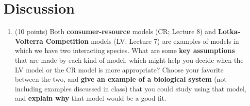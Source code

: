 \documentclass[11pt,onecolumn,superscriptaddress,notitlepage]{article}
\begin{document}
  \clearpage
  \section{Discussion}
 \begin{enumerate}[resume]
  \item (10 points) Both {\bf consumer-resource} models (CR; Lecture 8) and {\bf Lotka-Volterra Competition} models (LV; Lecture 7) are examples of models in which we have two interacting species. What are some {\bf key assumptions} that are made by each kind of model, which might help you decide when the LV model or the CR model is more appropriate?  Choose your favorite between the two, and {\bf give an example of a biological system} (not including examples discussed in class) that you could study using that model, and {\bf explain why} that model would be a good fit.
  
\end{enumerate}


\end{document}
